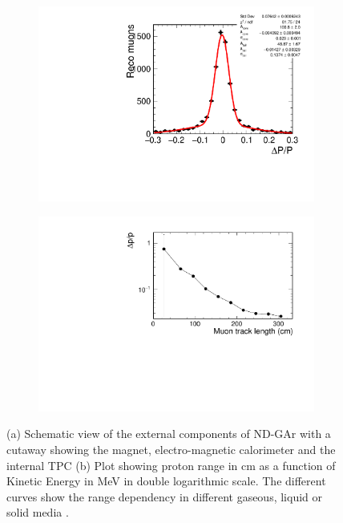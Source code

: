\begin{figure}[t]
     \centering
     \begin{subfigure}[b]{0.47\textwidth}
         \centering
         \includegraphics[width=\textwidth]{figures/ch3-DUNE/dpmuon.pdf}
         \caption{}
         \label{fig:GArTPCdp}
     \end{subfigure}
     \hfill
     \begin{subfigure}[b]{0.52\textwidth}
         \centering
         \includegraphics[width=\textwidth]{figures/ch3-DUNE/muonpoverpfunc.pdf}
         \caption{}
         \label{fig:GArTPCdpoverp}
     \end{subfigure}
        \caption{(a) Schematic view of the external components of ND-GAr with a cutaway showing the magnet, electro-magnetic calorimeter and the internal TPC  (b) Plot showing proton range in cm as a function of Kinetic Energy in MeV in double logarithmic scale. The different curves show the range dependency in different gaseous, liquid or solid media \cite{Lu}. }
        \label{fig:GARTPCdp}
\end{figure}

